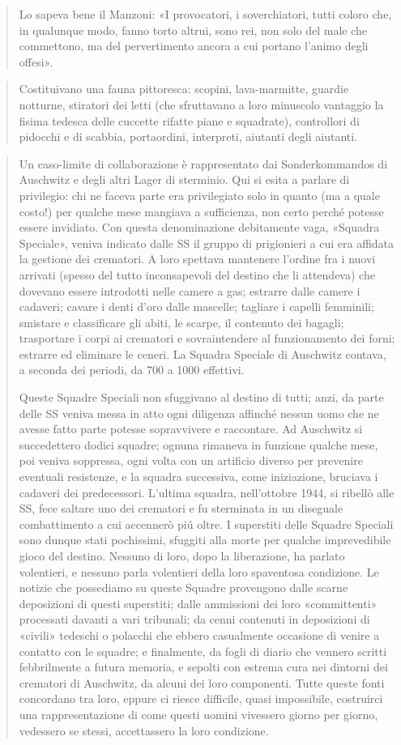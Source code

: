 \documentclass[a4paper, twoside, titlepage]{book}
\newcounter{mar}
\newcommand{\citazione}[1]{%
  \begin{quotation}
  \begin{linenumbers}
  \modulolinenumbers[5]
  \begingroup
  \setlength{\parindent}{0cm}
  \noindent #1
  \endgroup
  \end{linenumbers}
  \end{quotation}\setcounter{linenumber}{1}
  }
\begin{document}
\citazione{ Lo sapeva bene il Manzoni: «I provocatori, i soverchiatori, tutti coloro che, in qualunque modo, fanno torto altrui, sono rei, non solo del male che commettono, ma del pervertimento ancora a cui portano l’animo degli offesi».}

\citazione{ Costituivano una fauna pittoresca: scopini, lava-marmitte, guardie notturne, stiratori dei letti (che sfruttavano a loro minuscolo vantaggio la fisima tedesca delle cuccette rifatte piane e squadrate), controllori di pidocchi e di scabbia, portaordini, interpreti, aiutanti degli aiutanti.}

\citazione{ Un caso-limite di collaborazione è rappresentato dai Sonderkommandos di Auschwitz e degli altri Lager di sterminio. Qui si esita a parlare di privilegio: chi ne faceva parte era privilegiato solo in quanto (ma a quale costo!) per qualche mese mangiava a sufficienza, non certo perché potesse essere invidiato. Con questa denominazione debitamente vaga, «Squadra Speciale», veniva indicato dalle SS il gruppo di prigionieri a cui era affidata la gestione dei crematori. A loro spettava mantenere l’ordine fra i nuovi arrivati (spesso del tutto inconsapevoli del destino che li attendeva) che dovevano essere introdotti nelle camere a gas; estrarre dalle camere i cadaveri; cavare i denti d’oro dalle mascelle; tagliare i capelli femminili; smistare e classificare gli abiti, le scarpe, il contenuto dei bagagli; trasportare i corpi ai crematori e sovraintendere al funzionamento dei forni; estrarre ed eliminare le ceneri. La Squadra Speciale di Auschwitz contava, a seconda dei periodi, da 700 a 1000 effettivi.

Queste Squadre Speciali non sfuggivano al destino di tutti; anzi, da parte delle SS veniva messa in atto ogni diligenza affinché nessun uomo che ne avesse fatto parte potesse sopravvivere e raccontare. Ad Auschwitz si succedettero dodici squadre; ognuna rimaneva in funzione qualche mese, poi veniva soppressa, ogni volta con un artificio diverso per prevenire eventuali resistenze, e la squadra successiva, come iniziazione, bruciava i cadaveri dei predecessori. L’ultima squadra, nell’ottobre 1944, si ribellò alle SS, fece saltare uno dei crematori e fu sterminata in un diseguale combattimento a cui accennerò piú oltre. I superstiti delle Squadre Speciali sono dunque stati pochissimi, sfuggiti alla morte per qualche imprevedibile gioco del destino. Nessuno di loro, dopo la liberazione, ha parlato volentieri, e nessuno parla volentieri della loro spaventosa condizione. Le notizie che possediamo su queste Squadre provengono dalle scarne deposizioni di questi superstiti; dalle ammissioni dei loro «committenti» processati davanti a vari tribunali; da cenni contenuti in deposizioni di «civili» tedeschi o polacchi che ebbero casualmente occasione di venire a contatto con le squadre; e finalmente, da fogli di diario che vennero scritti febbrilmente a futura memoria, e sepolti con estrema cura nei dintorni dei crematori di Auschwitz, da alcuni dei loro componenti. Tutte queste fonti concordano tra loro, eppure ci riesce difficile, quasi impossibile, costruirci una rappresentazione di come questi uomini vivessero giorno per giorno, vedessero se stessi, accettassero la loro condizione.

}
\end{document}
